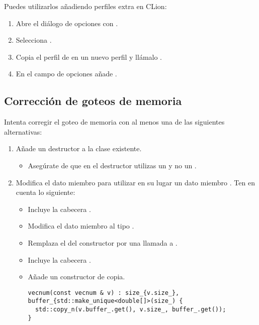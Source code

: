 Puedes utilizarlos añadiendo perfiles extra en CLion:

\begin{enumerate}

\item
Abre el diálogo de opciones con .

\item
Selecciona .

\item
Copia el perfil de  en un nuevo perfil 
y llámalo .

\item
En el campo de opciones añade
.

\end{enumerate}

\subsection{Corrección de goteos de memoria}

Intenta corregir el goteo de memoria con al menos una de las siguientes alternativas:

\begin{enumerate}

\item Añade un destructor a la clase existente.
\begin{itemize}
  \item Asegúrate de que en el destructor utilizas 
        un   
        y no un  .
\end{itemize}

\item Modifica el dato miembro  
para utilizar en su lugar un dato miembro .
Ten en cuenta lo siguiente:

\begin{itemize}
  \item Incluye la cabecera .
  \item Modifica el dato miembro  al tipo .
  \item Remplaza el  del constructor por una llamada a .
  \item Incluye la cabecera .
  \item Añade un constructor de copia.
\begin{lstlisting}
vecnum(const vecnum & v) : size_{v.size_}, buffer_{std::make_unique<double[]>(size_) {
  std::copy_n(v.buffer_.get(), v.size_, buffer_.get());
}
\end{lstlisting}
\end{itemize}

\end{enumerate}

